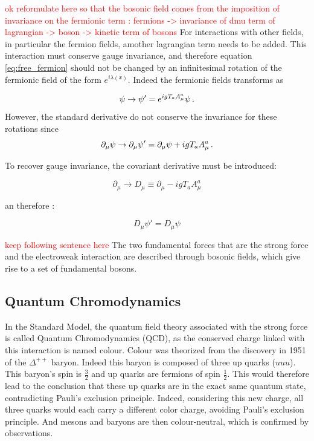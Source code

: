 \textcolor{red}{ok reformulate here so that the bosonic field comes from the imposition of invariance on the fermionic term : fermions -> invariance of dmu term of lagrangian -> boson -> kinetic term of bosons}
For interactions with other fields, in particular the fermion fields, amother lagrangian term needs to be added. This interaction must conserve gauge invariance, and therefore equation \ref{eq:free_fermion} should not be changed by an infinitesimal rotation of the fermionic field of the form $e^{i\lambda(x)}$. Indeed the fermionic fields transforms as

\begin{equation}
    \psi \rightarrow \psi' = e^{igT_{a}A_{\mu}^a}\psi \mend
\end{equation}
However, the standard derivative do not conserve the invariance for these rotations since
\begin{equation}
    \partial_{\mu}\psi \rightarrow \partial_{\mu}\psi' = \partial_{\mu}\psi + igT_{a}A_{\mu}^a \mend
\end{equation}

To recover gauge invariance, the covariant derivative must be introduced:

\begin{equation}
    \partial_{\mu} \rightarrow D_{\mu} \equiv \partial_{\mu} - igT_{a}A_{\mu}^a
\end{equation}

an therefore :

\begin{equation}
    D_{\mu}\psi' = D_{\mu}\psi
\end{equation}

\textcolor{red}{keep following sentence here}
The two fundamental forces that are the strong force and the electroweak interaction are described through bosonic fields, which give rise to a set of fundamental bosons.

\subsection{Quantum Chromodynamics}
\label{sec:QCD}

In the Standard Model, the quantum field theory associated with the strong force is called Quantum Chromodynamics (QCD), as the conserved charge linked with this interaction is named colour. Colour was theorized from the discovery in 1951 of the $\Delta^{++}$ baryon. Indeed this baryon is composed of three up quarks ($uuu$). This baryon's spin is $\frac{3}{2}$ and up quarks are fermions of spin $\frac{1}{2}$. This would therefore lead to the conclusion that these up quarks are in the exact same quantum state, contradicting Pauli's exclusion principle. Indeed, considering this new charge, all three quarks would each carry a different color charge, avoiding Pauli's exclusion principle. And mesons and baryons are then colour-neutral, which is confirmed by observations.

